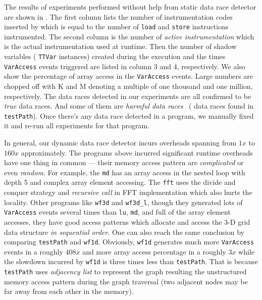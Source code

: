The results of experiments performed without help from static data race detector are shown in . The first column lists the number of instrumentation codes inserted by \Rewriter{} which is equal to the number of \verb|load| and \verb|store| instructions instrumented. The second column is the number of \textit{active instrumentation} which is the actual instrumentation used at runtime. Then the number of shadow variables (\ie{} \verb|TTVar| instances) created during the execution and the times \verb|VarAccess| events triggered are listed in column 3 and 4, respectively. We also show the percentage of array access in the \verb|VarAccess| events. Large numbers are chopped off with K and M denoting a multiple of one thousand and one million, respectively. The data races detected in our experiments are all confirmed to be \textit{true} data races. And some of them are \textit{harmful data races}~\cite{Narayanasamy:2007p819} (\ie{} data races found in \texttt{testPath}). Once there's any data race detected in a program, we manually fixed it and re-run all experiments for that program.

In general, our dynamic data race detector incurs overheads spanning from $1x$ to $160x$ approximately. The programs above incurred significant runtime overheads have one thing in common --- their memory access pattern are \textit{complicated} or even \textit{random}. For example, the \texttt{md} has an array access in the nested loop with depth 5 and complex array element accessing. The \texttt{fft} uses the divide and conquer strategy and \textit{recursive call} in FFT implementation which also hurts the locality. Other programs like \texttt{wf3d} and \texttt{wf3d\_l}, though they generated lots of \verb|VarAccess| events several times than \verb|lu|,  \verb|md|, \etc{} and full of the array element accesses, they have good access patterns which allocate and access the 3-D grid data structure \textit{in sequential order}. One can also reach the same conclusion by comparing \texttt{testPath} and \texttt{wf1d}. Obviously, \texttt{wf1d} generates much more \verb|VarAccess| events in a roughly $408x$ and more array access percentage in a roughly $3x$ while the slowdown incurred by \texttt{wf1d} is three times less than \texttt{testPath}. That is because \texttt{testPath} uses \textit{adjacency list} to represent the graph resulting the unstructured memory access pattern during the graph traversal (two adjacent nodes may be far away from each other in the memory). 


